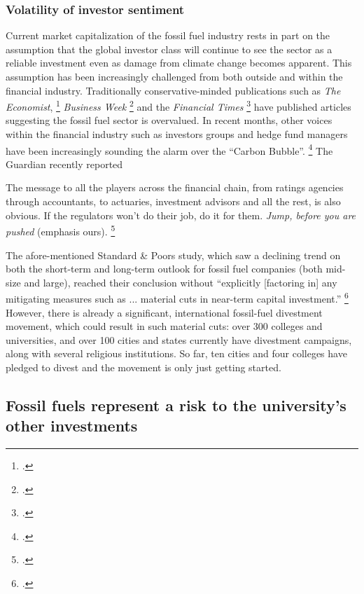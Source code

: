 \subsubsection {Volatility of investor sentiment}



Current market capitalization of the fossil fuel industry rests in part on the assumption that the global investor class will continue to see the sector as a reliable investment even as damage from climate change becomes apparent. 
This assumption has been increasingly challenged from both outside and within the financial industry. 
Traditionally conservative-minded publications such as \emph{The Economist}, \footcite{EconomistUnburnable} \emph{Business Week} \footcite{BusinessWeekOvervalued} and the \emph{Financial Times} \footcite{FTOvervalued} have published articles suggesting the fossil fuel sector is overvalued. 
In recent months, other voices within the financial industry such as investors groups and hedge fund managers have been increasingly sounding the alarm over the ``Carbon Bubble''. \footcite{JeremyGrantham} 
The Guardian recently reported
\begin{slquote}
The message to all the players across the financial chain, from ratings agencies through accountants, to actuaries, investment advisors and all the rest, is also obvious. If the regulators won't do their job, do it for them. \emph{Jump, before you are pushed} (emphasis ours). \footcite{Guardian6Trillion}
\end{slquote}
The afore-mentioned Standard \& Poors study, which saw a declining trend on both the short-term and long-term outlook for fossil fuel companies (both mid-size and large), reached their conclusion without ``explicitly [factoring in] any mitigating measures such as ... material cuts in near-term capital investment.'' \footcite{SandPConstrained}
However, there is already a significant, international fossil-fuel divestment movement, which could result in such material cuts: over 300 colleges and universities, and over 100 cities and states currently have divestment campaigns, along with several religious institutions.
So far, ten cities and four colleges have pledged to divest and the movement is only just getting started.









\subsection {Fossil fuels represent a risk to the university's other investments}

